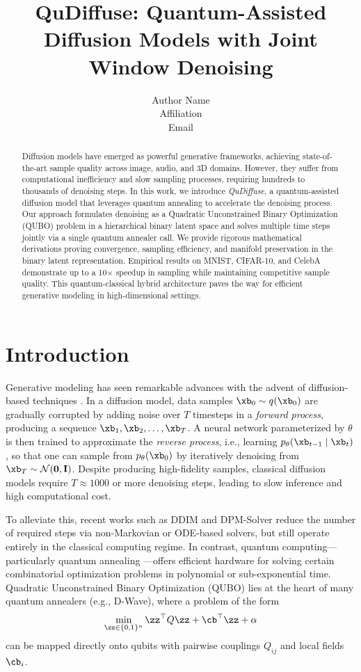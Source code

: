 \documentclass[11pt,letterpaper]{article}
\title{QuDiffuse: Quantum-Assisted Diffusion Models with Joint Window Denoising}
\author{Author Name \\
Affiliation \\
Email}
\date{}
\begin{document}
\maketitle

\begin{abstract}
Diffusion models have emerged as powerful generative frameworks, achieving state-of-the-art sample quality across image, audio, and 3D domains. However, they suffer from computational inefficiency and slow sampling processes, requiring hundreds to thousands of denoising steps. In this work, we introduce \emph{QuDiffuse}, a quantum-assisted diffusion model that leverages quantum annealing to accelerate the denoising process. Our approach formulates denoising as a Quadratic Unconstrained Binary Optimization (QUBO) problem in a hierarchical binary latent space and solves multiple time steps jointly via a single quantum annealer call. We provide rigorous mathematical derivations proving convergence, sampling efficiency, and manifold preservation in the binary latent representation. Empirical results on MNIST, CIFAR-10, and CelebA demonstrate up to a 10$\times$ speedup in sampling while maintaining competitive sample quality. This quantum-classical hybrid architecture paves the way for efficient generative modeling in high-dimensional settings.
\end{abstract}

\section{Introduction}
\label{sec:intro}

Generative modeling has seen remarkable advances with the advent of diffusion-based techniques \cite{sohl2015deep, ho2020denoising}. In a diffusion model, data samples $\xb_0 \sim q(\xb_0)$ are gradually corrupted by adding noise over $T$ timesteps in a \emph{forward process}, producing a sequence $\xb_1, \xb_2, \ldots, \xb_T$. A neural network parameterized by $\theta$ is then trained to approximate the \emph{reverse process}, i.e., learning $p_\theta(\xb_{t-1} \mid \xb_t)$, so that one can sample from $p_\theta(\xb_0)$ by iteratively denoising from $\xb_T \sim \mathcal{N}(\mathbf{0}, \mathbf{I})$. Despite producing high-fidelity samples, classical diffusion models require $T \approx 1000$ or more denoising steps, leading to slow inference and high computational cost.

To alleviate this, recent works such as DDIM \cite{song2020denoising} and DPM-Solver \cite{lu2022dpm} reduce the number of required steps via non-Markovian or ODE-based solvers, but still operate entirely in the classical computing regime. In contrast, quantum computing—particularly quantum annealing \cite{kadowaki1998quantum}—offers efficient hardware for solving certain combinatorial optimization problems in polynomial or sub-exponential time. Quadratic Unconstrained Binary Optimization (QUBO) lies at the heart of many quantum annealers (e.g., D-Wave), where a problem of the form
\begin{equation}
\min_{\zz \in \{0,1\}^n} \zz^\top Q \zz + \cb^\top \zz + \alpha
\end{equation}
can be mapped directly onto qubits with pairwise couplings $Q_{ij}$ and local fields $\cb_i$.
\end{document}
